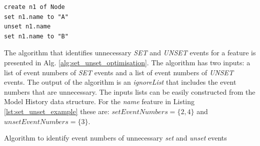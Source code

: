 \documentclass{llncs}
\begin{document}
\begin{lstlisting}[style=eol,caption={The CBP representation of attribute \emph{name} assignments.},label=lst:set_unset_example]
create n1 of Node
set n1.name to "A"
unset n1.name
set n1.name to "B"
\end{lstlisting}



The algorithm that identifies unnecessary \emph{SET} and \emph{UNSET} events for a feature is presented in Alg. \ref{alg:set_unset_optimisation}.
The algorithm has two inputs: a list of event numbers of \emph{SET} events and a list of event numbers of \emph{UNSET} events.
The output of the algorithm is an \emph{ignoreList} that includes the event numbers that are unnecessary.
The inputs lists can be easily constructed from the Model History data structure.
For the \emph{name} feature in Listing \ref{lst:set_unset_example} these are: $setEventNumbers = \{2,4\}$ and $unsetEventNumbers = \{3\}$.

\begin{algorithm}[H]
\begin{small}
\end{small}
\caption{Algorithm to identify event numbers of unnecessary \emph{set} and \emph{unset} events}
\label{alg:set_unset_optimisation}
\end{algorithm}
\end{document}
